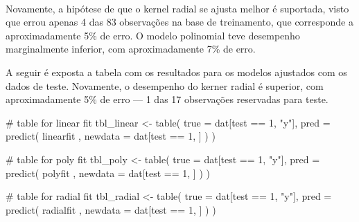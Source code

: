 \documentclass[
  a4paperpaper,
]{article}
\newenvironment{Shaded}{\begin{snugshade}}{\end{snugshade}}
\newcommand{\AttributeTok}[1]{\textcolor[rgb]{0.40,0.45,0.13}{#1}}
\newcommand{\CommentTok}[1]{\textcolor[rgb]{0.37,0.37,0.37}{#1}}
\newcommand{\DecValTok}[1]{\textcolor[rgb]{0.68,0.00,0.00}{#1}}
\newcommand{\FunctionTok}[1]{\textcolor[rgb]{0.28,0.35,0.67}{#1}}
\newcommand{\NormalTok}[1]{\textcolor[rgb]{0.00,0.23,0.31}{#1}}
\newcommand{\OtherTok}[1]{\textcolor[rgb]{0.00,0.23,0.31}{#1}}
\newcommand{\SpecialCharTok}[1]{\textcolor[rgb]{0.37,0.37,0.37}{#1}}
\newcommand{\StringTok}[1]{\textcolor[rgb]{0.13,0.47,0.30}{#1}}
\begin{document}
~

Novamente, a hipótese de que o kernel radial se ajusta melhor é
suportada, visto que errou apenas 4 das 83 observações na base de
treinamento, que corresponde a aproximadamente 5\% de erro. O modelo
polinomial teve desempenho marginalmente inferior, com aproximadamente
7\% de erro.

A seguir é exposta a tabela com os resultados para os modelos ajustados
com os dados de teste. Novamente, o desempenho do kerner radial é
superior, com aproximadamente 5\% de erro --- 1 das 17 observações
reservadas para teste.

\begin{Shaded}
\begin{Highlighting}[]
\CommentTok{\# table for linear fit}
\NormalTok{tbl\_linear }\OtherTok{\textless{}{-}} \FunctionTok{table}\NormalTok{(}
  \AttributeTok{true =}\NormalTok{ dat[test }\SpecialCharTok{==} \DecValTok{1}\NormalTok{, }\StringTok{"y"}\NormalTok{],}
  \AttributeTok{pred =} \FunctionTok{predict}\NormalTok{(}
\NormalTok{    linearfit , }\AttributeTok{newdata =}\NormalTok{ dat[test }\SpecialCharTok{==} \DecValTok{1}\NormalTok{, ]}
\NormalTok{  )}
\NormalTok{)}

\CommentTok{\# table for poly fit}
\NormalTok{tbl\_poly }\OtherTok{\textless{}{-}} \FunctionTok{table}\NormalTok{(}
  \AttributeTok{true =}\NormalTok{ dat[test }\SpecialCharTok{==} \DecValTok{1}\NormalTok{, }\StringTok{"y"}\NormalTok{],}
  \AttributeTok{pred =} \FunctionTok{predict}\NormalTok{(}
\NormalTok{    polyfit , }\AttributeTok{newdata =}\NormalTok{ dat[test }\SpecialCharTok{==} \DecValTok{1}\NormalTok{, ]}
\NormalTok{  )}
\NormalTok{)}

\CommentTok{\# table for radial fit}
\NormalTok{tbl\_radial }\OtherTok{\textless{}{-}} \FunctionTok{table}\NormalTok{(}
  \AttributeTok{true =}\NormalTok{ dat[test }\SpecialCharTok{==} \DecValTok{1}\NormalTok{, }\StringTok{"y"}\NormalTok{],}
  \AttributeTok{pred =} \FunctionTok{predict}\NormalTok{(}
\NormalTok{    radialfit , }\AttributeTok{newdata =}\NormalTok{ dat[test }\SpecialCharTok{==} \DecValTok{1}\NormalTok{, ]}
\NormalTok{  )}
\NormalTok{)}


\end{Highlighting}
\end{Shaded}
\end{document}
